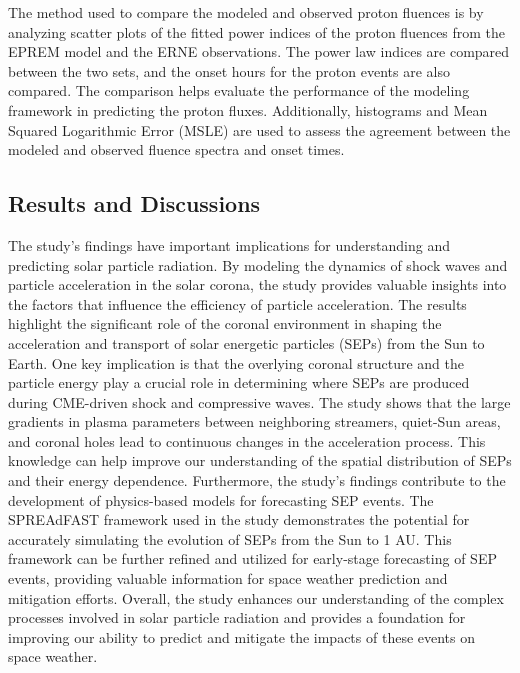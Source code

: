 The method used to compare the modeled and observed proton fluences is by analyzing scatter plots of the fitted power indices of the proton fluences from the EPREM model and the ERNE observations. The power law indices are compared between the two sets, and the onset hours for the proton events are also compared. The comparison helps evaluate the performance of the modeling framework in predicting the proton fluxes. Additionally, histograms and Mean Squared Logarithmic Error (MSLE) are used to assess the agreement between the modeled and observed fluence spectra and onset times.

\subsection{Results and Discussions}












The study's findings have important implications for understanding and predicting solar particle radiation. By modeling the dynamics of shock waves and particle acceleration in the solar corona, the study provides valuable insights into the factors that influence the efficiency of particle acceleration. The results highlight the significant role of the coronal environment in shaping the acceleration and transport of solar energetic particles (SEPs) from the Sun to Earth. One key implication is that the overlying coronal structure and the particle energy play a crucial role in determining where SEPs are produced during CME-driven shock and compressive waves. The study shows that the large gradients in plasma parameters between neighboring streamers, quiet-Sun areas, and coronal holes lead to continuous changes in the acceleration process. This knowledge can help improve our understanding of the spatial distribution of SEPs and their energy dependence. Furthermore, the study's findings contribute to the development of physics-based models for forecasting SEP events. The SPREAdFAST framework used in the study demonstrates the potential for accurately simulating the evolution of SEPs from the Sun to 1 AU. This framework can be further refined and utilized for early-stage forecasting of SEP events, providing valuable information for space weather prediction and mitigation efforts. Overall, the study enhances our understanding of the complex processes involved in solar particle radiation and provides a foundation for improving our ability to predict and mitigate the impacts of these events on space weather.

